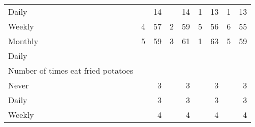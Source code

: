 \documentclass{article}
\begin{document}
\begin{tabular}{lllllllll}
\multicolumn{1}{l}{\hspace{5em}Daily} &
  \multicolumn{1}{|r}{} &
  \multicolumn{1}{r}{14} &
  \multicolumn{1}{r}{} &
  \multicolumn{1}{r}{14} &
  \multicolumn{1}{r}{1} &
  \multicolumn{1}{r}{13} &
  \multicolumn{1}{r}{1} &
  \multicolumn{1}{r}{13} \\
\multicolumn{1}{l}{\hspace{5em}Weekly} &
  \multicolumn{1}{|r}{4} &
  \multicolumn{1}{r}{57} &
  \multicolumn{1}{r}{2} &
  \multicolumn{1}{r}{59} &
  \multicolumn{1}{r}{5} &
  \multicolumn{1}{r}{56} &
  \multicolumn{1}{r}{6} &
  \multicolumn{1}{r}{55} \\
\multicolumn{1}{l}{\hspace{5em}Monthly} &
  \multicolumn{1}{|r}{5} &
  \multicolumn{1}{r}{59} &
  \multicolumn{1}{r}{3} &
  \multicolumn{1}{r}{61} &
  \multicolumn{1}{r}{1} &
  \multicolumn{1}{r}{63} &
  \multicolumn{1}{r}{5} &
  \multicolumn{1}{r}{59} \\
\multicolumn{1}{l}{\hspace{3em}Daily} &
  \multicolumn{1}{|r}{} &
  \multicolumn{1}{r}{} &
  \multicolumn{1}{r}{} &
  \multicolumn{1}{r}{} &
  \multicolumn{1}{r}{} &
  \multicolumn{1}{r}{} &
  \multicolumn{1}{r}{} &
  \multicolumn{1}{r}{} \\
\multicolumn{1}{l}{\hspace{4em}Number of times eat fried potatoes} &
  \multicolumn{1}{|r}{} &
  \multicolumn{1}{r}{} &
  \multicolumn{1}{r}{} &
  \multicolumn{1}{r}{} &
  \multicolumn{1}{r}{} &
  \multicolumn{1}{r}{} &
  \multicolumn{1}{r}{} &
  \multicolumn{1}{r}{} \\
\multicolumn{1}{l}{\hspace{5em}Never} &
  \multicolumn{1}{|r}{} &
  \multicolumn{1}{r}{3} &
  \multicolumn{1}{r}{} &
  \multicolumn{1}{r}{3} &
  \multicolumn{1}{r}{} &
  \multicolumn{1}{r}{3} &
  \multicolumn{1}{r}{} &
  \multicolumn{1}{r}{3} \\
\multicolumn{1}{l}{\hspace{5em}Daily} &
  \multicolumn{1}{|r}{} &
  \multicolumn{1}{r}{3} &
  \multicolumn{1}{r}{} &
  \multicolumn{1}{r}{3} &
  \multicolumn{1}{r}{} &
  \multicolumn{1}{r}{3} &
  \multicolumn{1}{r}{} &
  \multicolumn{1}{r}{3} \\
\multicolumn{1}{l}{\hspace{5em}Weekly} &
  \multicolumn{1}{|r}{} &
  \multicolumn{1}{r}{4} &
  \multicolumn{1}{r}{} &
  \multicolumn{1}{r}{4} &
  \multicolumn{1}{r}{} &
  \multicolumn{1}{r}{4} &
  \multicolumn{1}{r}{} &
  \multicolumn{1}{r}{4} \\

\end{tabular}
\end{document}

